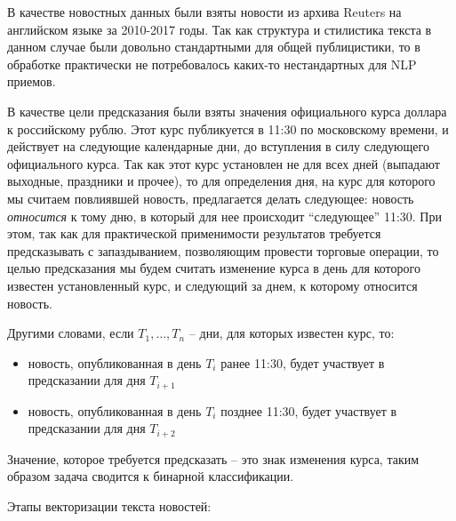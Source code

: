\documentclass[pdftex,ptm,12pt,a4paper]{report}
\begin{document}
В качестве новостных данных были взяты новости из архива Reuters на английском языке за 2010-2017 годы.
Так как структура и стилистика текста в данном случае были довольно стандартными для общей публицистики,
то в обработке практически не потребовалось каких-то нестандартных для NLP приемов.

В качестве цели предсказания были взяты значения официального курса доллара к российскому рублю. Этот курс публикуется 
в 11:30 по московскому времени, и действует на следующие календарные дни, до вступления в силу следующего
официального курса. Так как этот курс установлен не для всех дней (выпадают выходные, праздники и прочее),
то для определения дня, на курс для которого мы считаем повлиявшей новость, предлагается делать следующее:
новость \textit{относится} к тому дню, в который для нее происходит ``следующее'' 11:30. При этом, так как для практической
применимости результатов требуется предсказывать с запаздыванием, позволяющим провести торговые операции,
то целью предсказания мы будем считать изменение курса в день для которого известен установленный курс, и
следующий за днем, к которому относится новость.

Другими словами, если $T_1,\ldots , T_n$ -- дни, для которых известен курс, то:
\begin{itemize}
\item новость, опубликованная в день $T_i$ ранее 11:30, будет участвует в предсказании для дня $T_{i+1}$
\item новость, опубликованная в день $T_i$ позднее 11:30, будет участвует в предсказании для дня $T_{i+2}$
\end{itemize}

Значение, которое требуется предсказать -- это знак изменения курса, таким образом задача сводится к бинарной классификации.

Этапы векторизации текста новостей:
\end{document}
